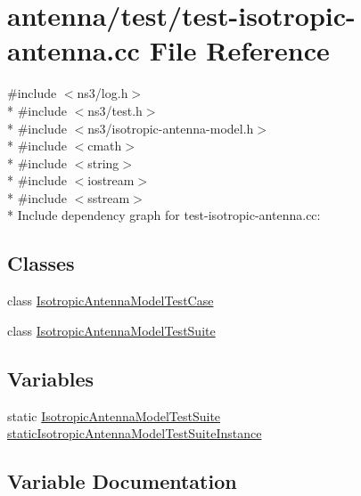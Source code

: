 \hypertarget{test-isotropic-antenna_8cc}{}\section{antenna/test/test-\/isotropic-\/antenna.cc File Reference}
\label{test-isotropic-antenna_8cc}
{\ttfamily \#include $<$ns3/log.\+h$>$}\\*
{\ttfamily \#include $<$ns3/test.\+h$>$}\\*
{\ttfamily \#include $<$ns3/isotropic-\/antenna-\/model.\+h$>$}\\*
{\ttfamily \#include $<$cmath$>$}\\*
{\ttfamily \#include $<$string$>$}\\*
{\ttfamily \#include $<$iostream$>$}\\*
{\ttfamily \#include $<$sstream$>$}\\*
Include dependency graph for test-\/isotropic-\/antenna.cc\+:
\subsection*{Classes}
\begin{DoxyCompactItemize}
\item 
class \hyperlink{classIsotropicAntennaModelTestCase}{Isotropic\+Antenna\+Model\+Test\+Case}
\item 
class \hyperlink{classIsotropicAntennaModelTestSuite}{Isotropic\+Antenna\+Model\+Test\+Suite}
\end{DoxyCompactItemize}
\subsection*{Variables}
\begin{DoxyCompactItemize}
\item 
static \hyperlink{classIsotropicAntennaModelTestSuite}{Isotropic\+Antenna\+Model\+Test\+Suite} \hyperlink{test-isotropic-antenna_8cc_a017c548b79c3ae9259977e62f25f7794}{static\+Isotropic\+Antenna\+Model\+Test\+Suite\+Instance}
\end{DoxyCompactItemize}


\subsection{Variable Documentation}

